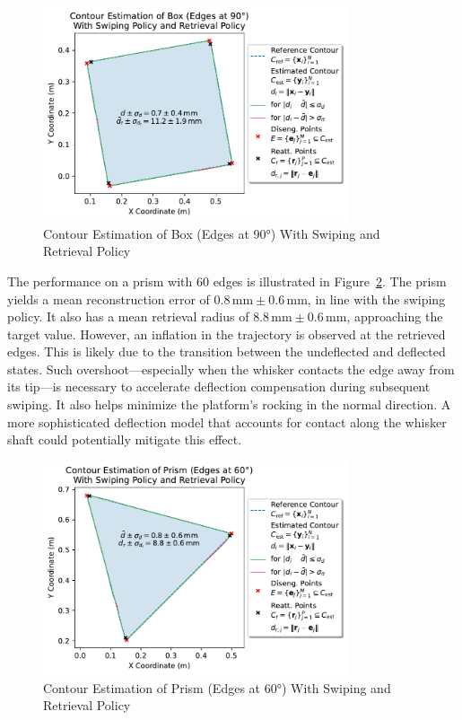 \begin{figure}[htb]
    \centering
    \includegraphics[width=0.8\textwidth]{figures/experiments/box-edges-90deg-swiping-retrieval}
    \caption{Contour Estimation of Box (Edges at 90°) With Swiping and Retrieval Policy}
    \label{fig:experiment-box-edges-90deg-swiping-retrieval}
\end{figure}

The performance on a prism with 60\degree{} edges is illustrated in Figure~\ref{fig:experiment-prism-edges-60deg-swiping-retrieval}.
The prism yields a mean reconstruction error of $0.8\,\text{mm} \pm 0.6\,\text{mm}$, in line with the swiping policy.
It also has a mean retrieval radius of $8.8\,\text{mm} \pm 0.6\,\text{mm}$, approaching the target value.
However, an inflation in the trajectory is observed at the retrieved edges.
This is likely due to the transition between the undeflected and deflected states.
Such overshoot—especially when the whisker contacts the edge away from its tip—is necessary to accelerate deflection compensation during subsequent swiping.
It also helps minimize the platform’s rocking in the normal direction.
A more sophisticated deflection model that accounts for contact along the whisker shaft could potentially mitigate this effect.

\begin{figure}[htb]
    \centering
    \includegraphics[width=0.8\textwidth]{figures/experiments/prism-edges-60deg-swiping-retrieval}
    \caption{Contour Estimation of Prism (Edges at 60°) With Swiping and Retrieval Policy}
    \label{fig:experiment-prism-edges-60deg-swiping-retrieval}
\end{figure}

